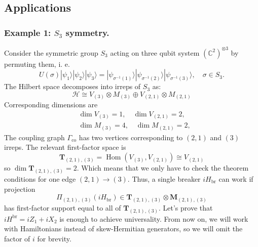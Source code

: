 \documentclass[11pt,letterpaper]{article}
\theoremstyle{plain}
\theoremstyle{plain}
\theoremstyle{plain}
\theoremstyle{plain}
\theoremstyle{plain}
\theoremstyle{plain}
\newcommand{\HH}{\mathcal{H}}
\theoremstyle{plain}
\theoremstyle{definition}
\theoremstyle{plain}
\begin{document}
\subsection{Applications}\label{sec:H_br_applications}
\label{sec:applications}

\subsubsection*{Example 1: $S_3$ symmetry.}

Consider the symmetric group $S_3$ acting on three qubit system $(\mathbb{C}^2)^{\otimes 3}$ by permuting them, i. e.
\[
U(\sigma)|\psi_1\rangle|\psi_2\rangle|\psi_3\rangle=|\psi_{\sigma^{-1}(1)}\rangle|\psi_{\sigma^{-1}(2)}\rangle|\psi_{\sigma^{-1}(3)}\rangle, \quad \sigma \in S_3.
\]
The Hilbert space decomposes into irreps of $S_3$ as:
\[
    \HH \cong V_{(3)} \otimes M_{(3)} \oplus V_{(2,1)} \otimes M_{(2,1)}
\]
Corresponding dimensions are
\[
    \begin{aligned}
    & \operatorname{dim} V_{(3)}=1, \quad \operatorname{dim} V_{(2,1)}=2, \\
    & \operatorname{dim} M_{(3)}=4, \quad \operatorname{dim} M_{(2,1)}=2,
    \end{aligned}
\]
The coupling graph $\Gamma_{\mathrm{co}}$ has two vertices corresponding to $(2,1)$ and $(3)$ irreps.
The relevant first-factor space is
\[
    \mathbf{T}_{(2,1),(3)}=\operatorname{Hom}\left(V_{(3)}, V_{(2,1)}\right) \cong V_{(2,1)}
\]
so $\operatorname{dim} \mathbf{T}_{(2,1),(3)}=2$. Which means that we only have to check the theorem conditions 
for one edge $(2,1)\to(3)$. Thus, a single breaker $iH_{\mathrm{br}}$ can work if projection
\[
    \Pi_{(2,1),(3)}\left(iH_{\mathrm{br}}\right) \in \mathbf{T}_{(2,1),(3)} \otimes \mathbf{M}_{(2,1),(3)}
\]
has first-factor support equal to all of $\mathbf{T}_{(2,1),(3)}$.
Let's prove that $iH^{\mathrm{br}}=iZ_1+iX_2$ is enough to achieve universality. From now on, we will work with Hamiltonians instead of skew-Hermitian generators, 
so we will omit the factor of $i$ for brevity. 
\end{document}
